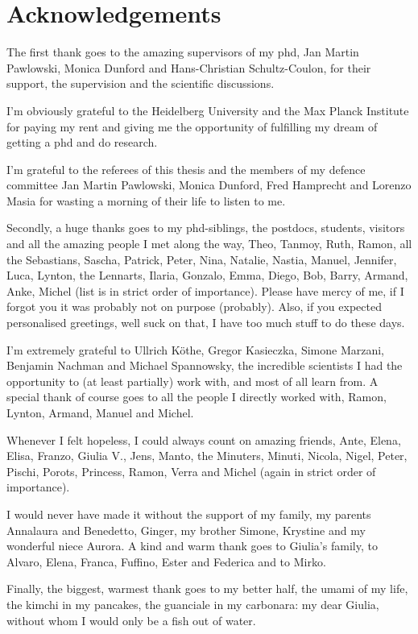 \chapter{Acknowledgements}\label{chap:acknowledgements}
\enlargethispage{2ex}
\vspace*{-2pt}
\thispagestyle{empty}

The first thank goes to the amazing supervisors of my phd,  Jan Martin Pawlowski, Monica Dunford and Hans-Christian Schultz-Coulon, for their support, the supervision and the scientific discussions.

\medskip

I'm obviously grateful to the Heidelberg University and the Max Planck Institute for paying my rent and giving me the opportunity of fulfilling my dream of getting a phd and do research.

\medskip

I'm grateful to the referees of this thesis and the members of my defence committee Jan Martin Pawlowski, Monica Dunford, Fred Hamprecht and Lorenzo Masia for wasting a morning of their life to listen to me.

\medskip

Secondly, a huge thanks goes to my phd-siblings, the postdocs, students, visitors and all the amazing people I met along the way, Theo, Tanmoy, Ruth, Ramon, all the Sebastians, Sascha, Patrick, Peter, Nina, Natalie, Nastia, Manuel, Jennifer, Luca, Lynton, the Lennarts, Ilaria, Gonzalo, Emma, Diego, Bob, Barry, Armand, Anke, Michel (list is in strict order of importance). Please have mercy of me, if I forgot you it was probably not on purpose (probably). Also, if you expected personalised greetings, well suck on that, I have too much stuff to do these days.

\medskip

I'm extremely grateful to Ullrich Köthe, Gregor Kasieczka, Simone Marzani, Benjamin Nachman and Michael Spannowsky, the incredible scientists I had the opportunity to (at least partially) work with, and most of all learn from. A special thank of course goes to all the people I directly worked with, Ramon, Lynton, Armand, Manuel and Michel.


\medskip

Whenever I felt hopeless, I could always count on amazing friends, Ante, Elena, Elisa, Franzo, Giulia V., Jens, Manto, the Minuters, Minuti, Nicola, Nigel, Peter, Pischi, Porots, Princess, Ramon, Verra and Michel (again in strict order of importance).

\medskip

I would never have made it without the support of my family, my parents Annalaura and Benedetto, Ginger, my brother Simone, Krystine and my wonderful niece Aurora. A kind and warm thank goes to Giulia's family, to Alvaro, Elena, Franca, Fuffino, Ester and Federica and to Mirko.

\medskip

Finally, the biggest, warmest thank goes to my better half, the umami of my life, the kimchi in my pancakes, the guanciale in my carbonara: my dear Giulia, without whom I would only be a fish out of water.

